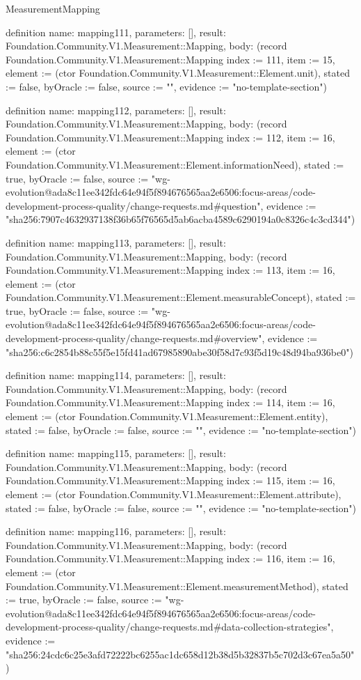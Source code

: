 \begin{lexlean}{MeasurementMapping}
\begin{semanticmodule}
definition{
  name: mapping111,
  parameters: [],
  result: Foundation.Community.V1.Measurement::Mapping,
  body: (record Foundation.Community.V1.Measurement::Mapping {index := 111, item := 15, element := (ctor Foundation.Community.V1.Measurement::Element.unit), stated := false, byOracle := false, source := "", evidence := "no-template-section"})
}

definition{
  name: mapping112,
  parameters: [],
  result: Foundation.Community.V1.Measurement::Mapping,
  body: (record Foundation.Community.V1.Measurement::Mapping {index := 112, item := 16, element := (ctor Foundation.Community.V1.Measurement::Element.informationNeed), stated := true, byOracle := false, source := "wg-evolution@ada8c11ee342fdc64e94f5f894676565aa2e6506:focus-areas/code-development-process-quality/change-requests.md#question", evidence := "sha256:7907c4632937138f36b65f76565d5ab6acba4589c6290194a0c8326c4c3cd344"})
}

definition{
  name: mapping113,
  parameters: [],
  result: Foundation.Community.V1.Measurement::Mapping,
  body: (record Foundation.Community.V1.Measurement::Mapping {index := 113, item := 16, element := (ctor Foundation.Community.V1.Measurement::Element.measurableConcept), stated := true, byOracle := false, source := "wg-evolution@ada8c11ee342fdc64e94f5f894676565aa2e6506:focus-areas/code-development-process-quality/change-requests.md#overview", evidence := "sha256:c6c2854b88c55f5e15fd41ad67985890abe30f58d7c93f5d19c48d94ba936be0"})
}

definition{
  name: mapping114,
  parameters: [],
  result: Foundation.Community.V1.Measurement::Mapping,
  body: (record Foundation.Community.V1.Measurement::Mapping {index := 114, item := 16, element := (ctor Foundation.Community.V1.Measurement::Element.entity), stated := false, byOracle := false, source := "", evidence := "no-template-section"})
}

definition{
  name: mapping115,
  parameters: [],
  result: Foundation.Community.V1.Measurement::Mapping,
  body: (record Foundation.Community.V1.Measurement::Mapping {index := 115, item := 16, element := (ctor Foundation.Community.V1.Measurement::Element.attribute), stated := false, byOracle := false, source := "", evidence := "no-template-section"})
}

definition{
  name: mapping116,
  parameters: [],
  result: Foundation.Community.V1.Measurement::Mapping,
  body: (record Foundation.Community.V1.Measurement::Mapping {index := 116, item := 16, element := (ctor Foundation.Community.V1.Measurement::Element.measurementMethod), stated := true, byOracle := false, source := "wg-evolution@ada8c11ee342fdc64e94f5f894676565aa2e6506:focus-areas/code-development-process-quality/change-requests.md#data-collection-strategies", evidence := "sha256:24cdc6c25e3afd72222bc6255ac1dc658d12b38d5b32837b5c702d3c67ea5a50"})
}


\end{semanticmodule}
\end{lexlean}
